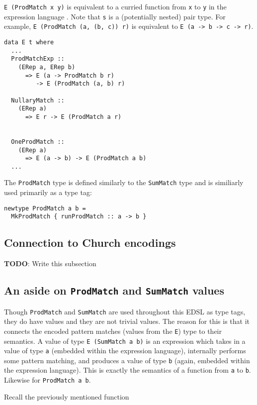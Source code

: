 \documentclass[sigplan,screen]{acmart}
\newcommand{\ttt}{\texttt}
\begin{document}
\ttt{E (ProdMatch x y)} is equivalent to a curried function from \ttt{x} to
\ttt{y} in the expression language .  Note that \ttt{s} is a (potentially
nested) pair type. For example, \ttt{E (ProdMatch (a, (b, c)) r)} is
equivalent to \ttt{E (a -> b -> c -> r)}.

\begin{lstlisting}
data E t where
  ...
  ProdMatchExp ::
    (ERep a, ERep b)
      => E (a -> ProdMatch b r)
         -> E (ProdMatch (a, b) r)

  NullaryMatch ::
    (ERep a)
      => E r -> E (ProdMatch a r)


  OneProdMatch ::
    (ERep a)
      => E (a -> b) -> E (ProdMatch a b)
  ...
\end{lstlisting}

The \ttt{ProdMatch} type is defined similarly to the \ttt{SumMatch} type and is
similiarly used primarily as a type tag:

\begin{lstlisting}
newtype ProdMatch a b =
  MkProdMatch { runProdMatch :: a -> b }
\end{lstlisting}

\subsection{Connection to Church encodings}
\begin{tcolorbox}
  \textbf{TODO}: Write this subsection
\end{tcolorbox}

\subsection{An aside on \ttt{ProdMatch} and \ttt{SumMatch} values}

Though \ttt{ProdMatch} and \ttt{SumMatch} are used throughout this EDSL as type
tags, they do have values and they are not trivial values. The reason for this
is that it connects the encoded pattern matches (values from the \ttt{E}) type
to their semantics. A value of type \ttt{E (SumMatch a b)} is an expression
which takes in a value of type \ttt{a} (embedded within the expression
language), internally performs some pattern matching, and produces a value of
type \ttt{b} (again, embedded within the expression language). This is exactly
the semantics of a function from \ttt{a} to \ttt{b}. Likewise for \ttt{ProdMatch a b}.

Recall the previously mentioned function
\end{document}
